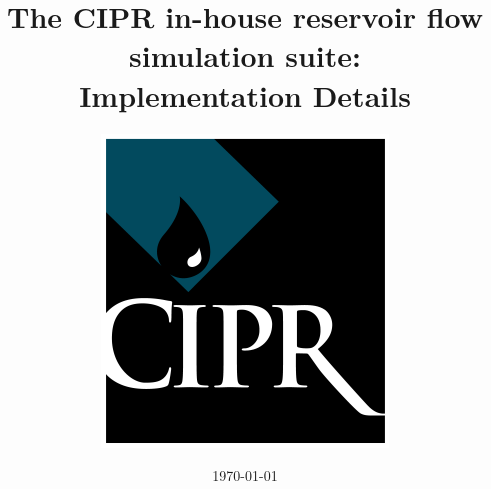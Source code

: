 \documentclass[a4paper,twoside,openright]{report}
\begin{document}
\dominitoc

\title{The CIPR in-house reservoir flow simulation suite:\\
Implementation Details}
\author{\includegraphics[scale=2]{../figures/cipr-logo}}
\date{\today}

\maketitle

\tableofcontents

























\end{document}
